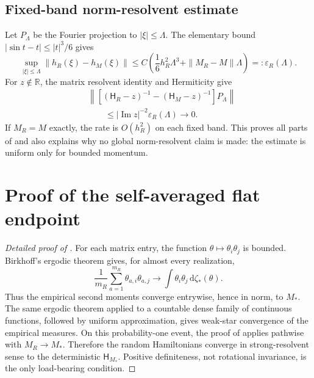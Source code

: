 \documentclass[11pt]{article}
\theoremstyle{definition}
\theoremstyle{remark}
\newcommand{\R}{\mathbb R}
\newcommand{\Ham}{\mathsf H}
\newcommand{\dd}{\mathrm d}
\newcommand{\im}{\operatorname{Im}}
\begin{document}
\subsection{Fixed-band norm-resolvent estimate}

Let $P_\Lambda$ be the Fourier projection to $|\xi|\le\Lambda$.  The elementary
bound $|\sin t-t|\le|t|^3/6$ gives
\[
 \sup_{|\xi|\le\Lambda}\|h_R(\xi)-h_M(\xi)\|
 \le C\left(\frac16h_R^2\Lambda^3+
 \|M_R-M\|\Lambda\right)=:\varepsilon_R(\Lambda).
\]
For $z\notin\R$, the matrix resolvent identity and Hermiticity give
\[
 \begin{aligned}
 &\left\|\left[(\Ham_R-z)^{-1}-(\Ham_M-z)^{-1}\right]P_\Lambda\right\|\\
 &\qquad\le |\im z|^{-2}\varepsilon_R(\Lambda)\longrightarrow0.
 \end{aligned}
\]
If $M_R=M$ exactly, the rate is $O(h_R^2)$ on each fixed band.  This proves all
parts of  and also explains why no global norm-resolvent
claim is made: the estimate is uniform only for bounded momentum.

\section{Proof of the self-averaged flat endpoint}
\label{app:proof-self-averaging}

\begin{proof}[Detailed proof of ]
For each matrix entry, the function
$\theta\mapsto\theta_i\theta_j$ is bounded.  Birkhoff's ergodic theorem gives,
for almost every realization,
\[
 \frac1{m_R}\sum_{a=1}^{m_R}\theta_{a,i}\theta_{a,j}
 \longrightarrow
 \int\theta_i\theta_j\,\dd\zeta_*(\theta).
\]
Thus the empirical second moments converge entrywise, hence in norm, to $M_*$.
The same ergodic theorem applied to a countable dense family of continuous
functions, followed by uniform approximation, gives weak-star convergence of
the empirical measures.  On this probability-one event, the proof of
 applies pathwise with $M_R\to M_*$.  Therefore the random
Hamiltonians converge in strong-resolvent sense to the deterministic
$\Ham_{M_*}$.  Positive definiteness, not rotational invariance, is the only
load-bearing condition.
\end{proof}

\end{document}
